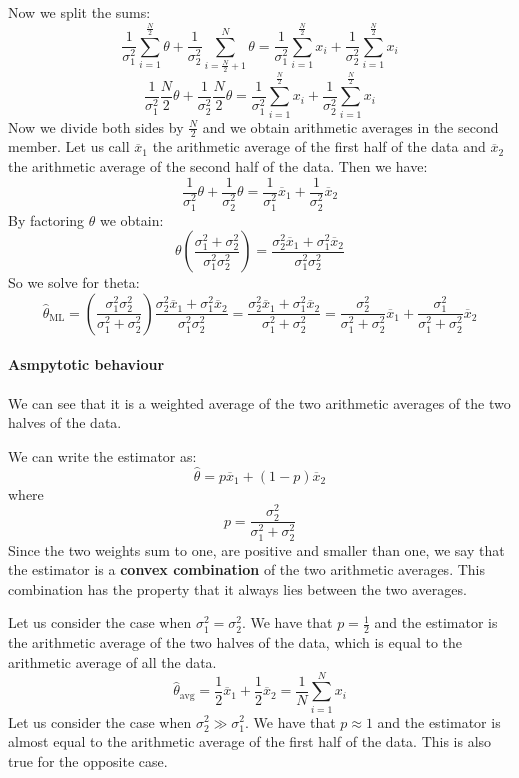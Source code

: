 Now we split the sums:
\[
    \frac{1}{\sigma_1^2} \sum_{i=1}^{\frac{N}{2}} \theta + \frac{1}{\sigma_2^2} \sum_{i=\frac{N}{2} + 1}^{N} \theta = \frac{1}{\sigma_1^2} \sum_{i=1}^{\frac{N}{2}} x_i + \frac{1}{\sigma_2^2} \sum_{i=1}^{\frac{N}{2}} x_i
\]
\[
    \frac{1}{\sigma_1^2} \frac{N}{2} \theta + \frac{1}{\sigma_2^2} \frac{N}{2} \theta = \frac{1}{\sigma_1^2} \sum_{i=1}^{\frac{N}{2}} x_i + \frac{1}{\sigma_2^2} \sum_{i=1}^{\frac{N}{2}} x_i
\]
Now we divide both sides by $\frac{N}{2}$ and we obtain arithmetic averages in the second member. Let us call $\overline{x}_1$ the arithmetic average of the first half of the data and $\overline{x}_2$ the arithmetic average of the second half of the data. Then we have:
\[
    \frac{1}{\sigma_1^2} \theta + \frac{1}{\sigma_2^2} \theta = \frac{1}{\sigma_1^2} \overline{x}_1 + \frac{1}{\sigma_2^2} \overline{x}_2
\]
By factoring $\theta$ we obtain:
\[
    \theta \left(\frac{\sigma_1^2 + \sigma_2^2}{\sigma_1^2\sigma_2^2}\right) = \frac{\sigma_2^2\overline{x}_1 + \sigma_1^2\overline{x}_2}{\sigma_1^2 \sigma_2^2}
\]
So we solve for theta:
\[
    \hat{\theta}_{\text{ML}} = \left(\frac{\sigma_1^2\sigma_2^2}{\sigma_1^2 + \sigma_2^2}\right) \frac{\sigma_2^2\overline{x}_1 + \sigma_1^2\overline{x}_2}{\sigma_1^2 \sigma_2^2} = \frac{\sigma_2^2\overline{x}_1 + \sigma_1^2\overline{x}_2}{\sigma_1^2 + \sigma_2^2} = \frac{\sigma_2^2}{\sigma_1^2 + \sigma_2^2} \overline{x}_1 + \frac{\sigma_1^2}{\sigma_1^2 + \sigma_2^2} \overline{x}_2
\]
\paragraph*{Asmpytotic behaviour}
We can see that it is a weighted average of the two arithmetic averages of the two halves of the data.

We can write the estimator as:
\[
    \hat{\theta} = p \overline{x}_1 + (1 - p) \overline{x}_2
\]
where
\[
    p = \frac{\sigma_2^2}{\sigma_1^2 + \sigma_2^2}
\]
Since the two weights sum to one, are positive and smaller than one, we say that the estimator is a \textbf{convex combination} of the two arithmetic averages. This combination has the property that it always lies between the two averages.

Let us consider the case when $\sigma_1^2 = \sigma_2^2$. We have that $p = \frac{1}{2}$ and the estimator is the arithmetic average of the two halves of the data, which is equal to the arithmetic average of all the data.
\[
    \hat{\theta}_{\text{avg}} = \frac{1}{2} \overline{x}_1 + \frac{1}{2} \overline{x}_2 = \frac{1}{N} \sum_{i=1}^{N} x_i
\]
Let us consider the case when $\sigma_2^2 \gg \sigma_1^2$. We have that $p \approx 1$ and the estimator is almost equal to the arithmetic average of the first half of the data. This is also true for the opposite case.

